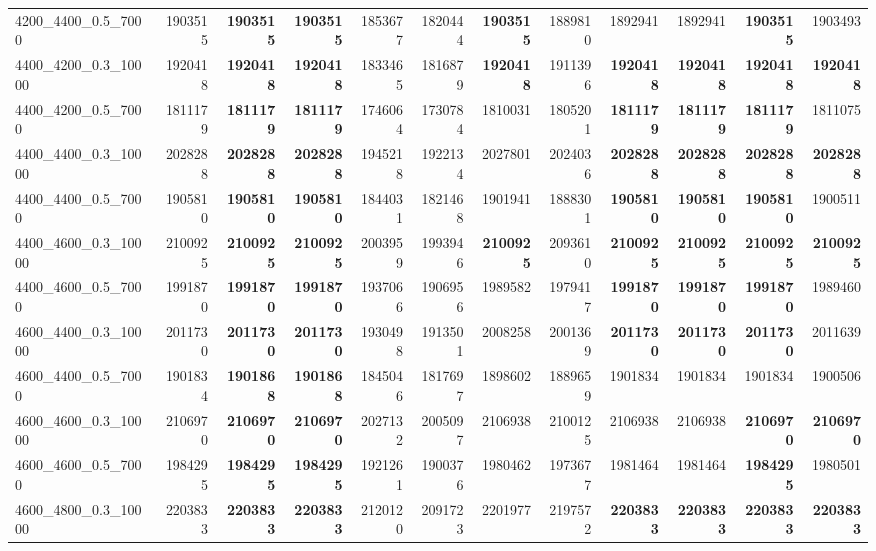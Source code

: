 \begin{landscape}
\begin{longtable}{lrrrrrrrrrrr}
4200\_4400\_0.5\_7000 & 1903515 & \textbf{1903515} & \textbf{1903515} & 1853677 & 1820444 & \textbf{1903515} & 1889810 & 1892941 & 1892941 & \textbf{1903515} & 1903493\\
4400\_4200\_0.3\_10000 & 1920418 & \textbf{1920418} & \textbf{1920418} & 1833465 & 1816879 & \textbf{1920418} & 1911396 & \textbf{1920418} & \textbf{1920418} & \textbf{1920418} & \textbf{1920418}\\
4400\_4200\_0.5\_7000 & 1811179 & \textbf{1811179} & \textbf{1811179} & 1746064 & 1730784 & 1810031 & 1805201 & \textbf{1811179} & \textbf{1811179} & \textbf{1811179} & 1811075\\
4400\_4400\_0.3\_10000 & 2028288 & \textbf{2028288} & \textbf{2028288} & 1945218 & 1922134 & 2027801 & 2024036 & \textbf{2028288} & \textbf{2028288} & \textbf{2028288} & \textbf{2028288}\\
4400\_4400\_0.5\_7000 & 1905810 & \textbf{1905810} & \textbf{1905810} & 1844031 & 1821468 & 1901941 & 1888301 & \textbf{1905810} & \textbf{1905810} & \textbf{1905810} & 1900511\\
4400\_4600\_0.3\_10000 & 2100925 & \textbf{2100925} & \textbf{2100925} & 2003959 & 1993946 & \textbf{2100925} & 2093610 & \textbf{2100925} & \textbf{2100925} & \textbf{2100925} & \textbf{2100925}\\
4400\_4600\_0.5\_7000 & 1991870 & \textbf{1991870} & \textbf{1991870} & 1937066 & 1906956 & 1989582 & 1979417 & \textbf{1991870} & \textbf{1991870} & \textbf{1991870} & 1989460\\
4600\_4400\_0.3\_10000 & 2011730 & \textbf{2011730} & \textbf{2011730} & 1930498 & 1913501 & 2008258 & 2001369 & \textbf{2011730} & \textbf{2011730} & \textbf{2011730} & 2011639\\
4600\_4400\_0.5\_7000 & 1901834 & \textbf{1901868} & \textbf{1901868} & 1845046 & 1817697 & 1898602 & 1889659 & 1901834 & 1901834 & 1901834 & 1900506\\
4600\_4600\_0.3\_10000 & 2106970 & \textbf{2106970} & \textbf{2106970} & 2027132 & 2005097 & 2106938 & 2100125 & 2106938 & 2106938 & \textbf{2106970} & \textbf{2106970}\\
4600\_4600\_0.5\_7000 & 1984295 & \textbf{1984295} & \textbf{1984295} & 1921261 & 1900376 & 1980462 & 1973677 & 1981464 & 1981464 & \textbf{1984295} & 1980501\\
4600\_4800\_0.3\_10000 & 2203833 & \textbf{2203833} & \textbf{2203833} & 2120120 & 2091723 & 2201977 & 2197572 & \textbf{2203833} & \textbf{2203833} & \textbf{2203833} & \textbf{2203833}\\

\end{longtable}
\end{landscape}
